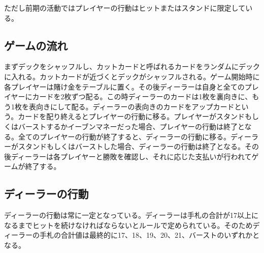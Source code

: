 ただし前期の活動ではプレイヤーの行動はヒットまたはスタンドに限定している。

\subsection{ゲームの流れ}
まずデックをシャッフルし、カットカードと呼ばれるカードをランダムにデックに入れる。カットカードが近づくとデックがシャッフルされる。ゲーム開始時に各プレイヤーは賭け金をテーブルに置く。その後ディーラーは自身と全てのプレイヤーにカードを2枚ずつ配る。この時ディーラーのカードは1枚を裏向きに、もう1枚を表向きにして配る。ディーラーの表向きのカードをアップカードという。カードを配り終えるとプレイヤーの行動に移る。プレイヤーがスタンドもしくはバーストするかイーブンマネーだった場合、プレイヤーの行動は終了となる。全てのプレイヤーの行動が終了すると、ディーラーの行動に移る。ディーラーがスタンドもしくはバーストした場合、ディーラーの行動は終了となる。その後ディーラーは各プレイヤーと勝敗を確認し、それに応じた支払いが行われてゲームが終了する。

\subsection{ディーラーの行動}
ディーラーの行動は常に一定となっている。ディーラーは手札の合計が17以上になるまでヒットを続けなければならないとルールで定められている。そのためディーラーの手札の合計値は最終的に17、18、19、20、21、バーストのいずれかとなる。

